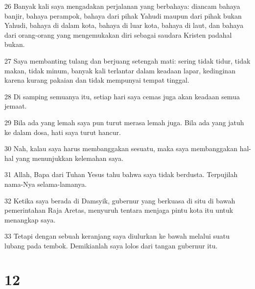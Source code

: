 \par 26 Banyak kali saya mengadakan perjalanan yang berbahaya: diancam bahaya banjir, bahaya perampok, bahaya dari pihak Yahudi maupun dari pihak bukan Yahudi, bahaya di dalam kota, bahaya di luar kota, bahaya di laut, dan bahaya dari orang-orang yang mengemukakan diri sebagai saudara Kristen padahal bukan.
\par 27 Saya membanting tulang dan berjuang setengah mati: sering tidak tidur, tidak makan, tidak minum, banyak kali terlantar dalam keadaan lapar, kedinginan karena kurang pakaian dan tidak mempunyai tempat tinggal.
\par 28 Di samping semuanya itu, setiap hari saya cemas juga akan keadaan semua jemaat.
\par 29 Bila ada yang lemah saya pun turut merasa lemah juga. Bila ada yang jatuh ke dalam dosa, hati saya turut hancur.
\par 30 Nah, kalau saya harus membanggakan sesuatu, maka saya membanggakan hal-hal yang menunjukkan kelemahan saya.
\par 31 Allah, Bapa dari Tuhan Yesus tahu bahwa saya tidak berdusta. Terpujilah nama-Nya selama-lamanya.
\par 32 Ketika saya berada di Damsyik, gubernur yang berkuasa di situ di bawah pemerintahan Raja Aretas, menyuruh tentara menjaga pintu kota itu untuk menangkap saya.
\par 33 Tetapi dengan sebuah keranjang saya diulurkan ke bawah melalui suatu lubang pada tembok. Demikianlah saya lolos dari tangan gubernur itu.

\chapter{12}

